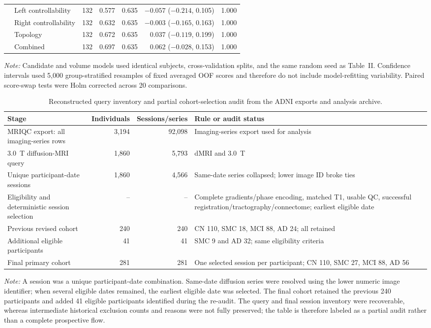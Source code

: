 \documentclass{article}
\begin{document}
\begin{landscape}
\begin{longtable}{llrrrrr}
& Left controllability & 132 & 0.577 & 0.635 & $-0.057$ ($-0.214$, 0.105) & 1.000\\
& Right controllability & 132 & 0.632 & 0.635 & $-0.003$ ($-0.165$, 0.163) & 1.000\\
& Topology & 132 & 0.672 & 0.635 & 0.037 ($-0.119$, 0.199) & 1.000\\
& Combined & 132 & 0.697 & 0.635 & 0.062 ($-0.028$, 0.153) & 1.000\\
\bottomrule
\end{longtable}
\footnotesize\textit{Note:} Candidate and volume models used identical subjects, cross-validation splits, and the same random seed as Table~II. Confidence intervals used 5,000 group-stratified resamples of fixed averaged OOF scores and therefore do not include model-refitting variability. Paired score-swap tests were Holm corrected across 20 comparisons.
\end{landscape}

\begin{table}[!htbp]
\centering
\caption{Reconstructed query inventory and partial cohort-selection audit from the ADNI exports and analysis archive.}
\label{tab:cohort_flow_audit}
\footnotesize
\begin{tabular}{p{}rrp{}}
\toprule
Stage & Individuals & Sessions/series & Rule or audit status\\
\midrule
MRIQC export: all imaging-series rows & 3,194 & 92,098 & Imaging-series export used for analysis\\
3.0~T diffusion-MRI query & 1,860 & 5,793 & dMRI and 3.0~T\\
Unique participant-date sessions & 1,860 & 4,566 & Same-date series collapsed; lower image ID broke ties\\
Eligibility and deterministic session selection & -- & -- & Complete gradients/phase encoding, matched T1, usable QC, successful registration/tractography/connectome; earliest eligible date\\
Previous revised cohort & 240 & 240 & CN 110, SMC 18, MCI 88, AD 24; all retained\\
Additional eligible participants & 41 & 41 & SMC 9 and AD 32; same eligibility criteria\\
Final primary cohort & 281 & 281 & One selected session per participant; CN 110, SMC 27, MCI 88, AD 56\\
\bottomrule
\end{tabular}
\par\vspace{1mm}
\footnotesize{\textit{Note:} A session was a unique participant-date combination. Same-date diffusion series were resolved using the lower numeric image identifier; when several eligible dates remained, the earliest eligible date was selected. The final cohort retained the previous 240 participants and added 41 eligible participants identified during the re-audit. The query and final session inventory were recoverable, whereas intermediate historical exclusion counts and reasons were not fully preserved; the table is therefore labeled as a partial audit rather than a complete prospective flow.}
\end{table}
\end{document}
